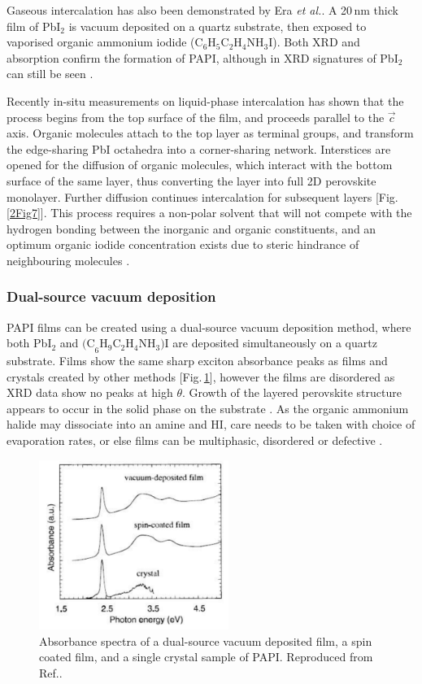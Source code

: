 Gaseous intercalation has also been demonstrated by Era \textit{et al.}. A 20\,nm thick film of Pb$\textrm{I}_2$ is vacuum deposited on a quartz substrate, then exposed to vaporised organic ammonium iodide ($\textrm{C}_6\textrm{H}_5\textrm{C}_2\textrm{H}_4\textrm{NH}_3\textrm{I}$). Both XRD and absorption confirm the formation of PAPI, although in XRD signatures of Pb$\textrm{I}_2$ can still be seen \cite{Era1998}.

Recently in-situ measurements on liquid-phase intercalation has shown that the process begins from the top surface of the  film, and proceeds parallel to the $\vec{c}$ axis. Organic molecules attach to the top  layer as terminal groups, and transform the edge-sharing PbI octahedra into a corner-sharing network. Interstices are opened for the diffusion of organic molecules, which interact with the bottom surface of the same layer, thus converting the  layer into full 2D perovskite monolayer. Further diffusion continues intercalation for subsequent layers [Fig.\,\ref{2Fig7}]. This process requires a non-polar solvent that will not compete with the hydrogen bonding between the inorganic and organic constituents, and an optimum organic iodide concentration exists due to steric hindrance of neighbouring molecules \cite{Ahmad2014}.

\subsubsection{Dual-source vacuum deposition}
PAPI films can be created using a dual-source vacuum deposition method, where both Pb$\textrm{I}_2$ and $\textrm{(C}_6\textrm{H}_9\textrm{C}_2\textrm{H}_4\textrm{NH}_3)\textrm{I}$ are deposited simultaneously on a quartz substrate. Films show the same sharp exciton absorbance peaks as films and crystals created by other methods [Fig.\,\ref{2Fig8}], however the films are disordered as XRD data show no peaks at high $\theta$. Growth of the layered perovskite structure appears to occur in the solid phase on the substrate \cite{Era1997}. As the organic ammonium halide may dissociate into an amine and HI, care needs to be taken with choice of evaporation rates, or else films can be multiphasic, disordered or defective \cite{Mitzi1999}.
\begin{figure}[h!]
\centering
\includegraphics[width=0.55\textwidth]{Fig8}
\caption{Absorbance spectra of a dual-source vacuum deposited film, a spin coated film, and a single crystal sample of PAPI. Reproduced from Ref.\!.}
\label{2Fig8}
\end{figure}


